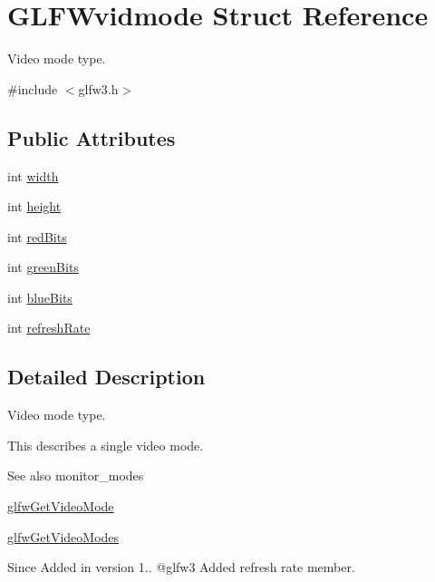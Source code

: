 \hypertarget{struct_g_l_f_wvidmode}{}\section{G\+L\+F\+Wvidmode Struct Reference}
\label{struct_g_l_f_wvidmode}


Video mode type.  




{\ttfamily \#include $<$glfw3.\+h$>$}

\subsection*{Public Attributes}
\begin{DoxyCompactItemize}
\item 
int \mbox{\hyperlink{struct_g_l_f_wvidmode_a698dcb200562051a7249cb6ae154c71d}{width}}
\item 
int \mbox{\hyperlink{struct_g_l_f_wvidmode_ac65942a5f6981695517437a9d571d03c}{height}}
\item 
int \mbox{\hyperlink{struct_g_l_f_wvidmode_a6066c4ecd251098700062d3b735dba1b}{red\+Bits}}
\item 
int \mbox{\hyperlink{struct_g_l_f_wvidmode_a292fdd281f3485fb3ff102a5bda43faa}{green\+Bits}}
\item 
int \mbox{\hyperlink{struct_g_l_f_wvidmode_af310977f58d2e3b188175b6e3d314047}{blue\+Bits}}
\item 
int \mbox{\hyperlink{struct_g_l_f_wvidmode_a791bdd6c7697b09f7e9c97054bf05649}{refresh\+Rate}}
\end{DoxyCompactItemize}


\subsection{Detailed Description}
Video mode type. 

This describes a single video mode.

\begin{DoxySeeAlso}{See also}
monitor\+\_\+modes 

\mbox{\hyperlink{group__monitor_gac234b63ec525c70d7e18ac84aca088c6}{glfw\+Get\+Video\+Mode}} 

\mbox{\hyperlink{group__monitor_ga811c28d61595e630774389985947c665}{glfw\+Get\+Video\+Modes}}
\end{DoxySeeAlso}
\begin{DoxySince}{Since}
Added in version 1.. @glfw3 Added refresh rate member. 
\end{DoxySince}


